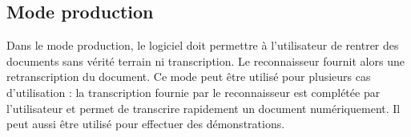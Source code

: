 \paragraph{}
\begin{mdframed}[frametitle={Annexe A.2.1 : Avec détection de lignes}, innerbottommargin=10]
\begin{center}
\end{center}
\end{mdframed}

\paragraph{}
\begin{mdframed}[frametitle={Annexe A.2.2 : Sans détection de lignes}, innerbottommargin=10]
\begin{center}
\end{center}
\end{mdframed}

\subsection{Mode production}

Dans le mode production, le logiciel doit permettre à l’utilisateur de rentrer des documents
sans vérité terrain ni transcription. Le reconnaisseur fournit alors une retranscription du
document. Ce mode peut être utilisé pour plusieurs cas d’utilisation : la transcription fournie
par le reconnaisseur est complétée par l’utilisateur et permet de transcrire rapidement un document
numériquement. Il peut aussi être utilisé pour effectuer des démonstrations.

\paragraph{}
\begin{mdframed}[frametitle={Annexe A.3.1 : Avec détection de lignes}, innerbottommargin=10]
\begin{center}
\end{center}
\end{mdframed}

\paragraph{}
\begin{mdframed}[frametitle={Annexe A.3.2 : Sans détection de lignes}, innerbottommargin=10]
\begin{center}
\end{center}
\end{mdframed}